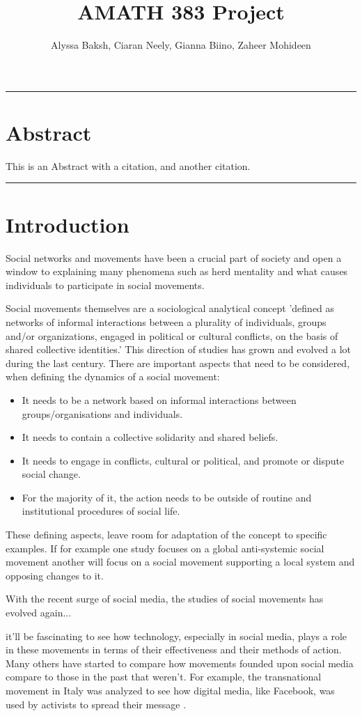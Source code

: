 \documentclass{article}
\title{AMATH 383 Project}
\author{
    Alyssa Baksh, 
    Ciaran Neely,
    Gianna Biino,
    Zaheer Mohideen
}
\begin{document}
    \maketitlekkkkkkk
    
    \hrule
    \section{Abstract}
    This is an Abstract with a citation\cite{kaveh_defining_2020}, and another citation\cite{small_movements_2021}.
    \hrule
    \section{Introduction}
    Social networks and movements have been a crucial part of society and open a window to explaining many phenomena such as herd mentality and what causes individuals to participate in social movements\cite{diani_networks_2013}.
    
    Social movements themselves are a sociological analytical concept 'defined as networks of informal interactions between a plurality of individuals, groups and/or organizations, engaged in political or cultural conflicts, on the basis of shared collective identities.' This direction of studies has grown and evolved a lot during the last century. There are important aspects that need to be considered, when defining the dynamics of a social movement: 
    \begin{itemize}
    \item It needs to be a network based on informal interactions between groups/organisations and individuals. 
    \item It needs to contain a collective solidarity and shared beliefs.
    \item It needs to engage in conflicts, cultural or political, and promote or dispute social change.
    \item  For the majority of it, the action needs to be outside of routine and institutional procedures of social life.
    \end{itemize}
    These defining aspects, leave room for adaptation of the concept to specific examples. If for example one study focuses on a global anti-systemic social movement another will focus on a social movement supporting a local system and opposing changes to it\cite{diani_concept_1992}.
    
    With the recent surge of social media, the studies of social movements has evolved again...
    
    it'll be fascinating to see how technology, especially in social media, plays a role in these movements in terms of their effectiveness and their methods of action. Many others have started to compare how movements founded upon social media compare to those in the past that weren't. For example, the transnational movement in Italy was analyzed to see how digital media, like Facebook, was used by activists to spread their message \cite{pavan_digital_2019}. 
\end{document}

